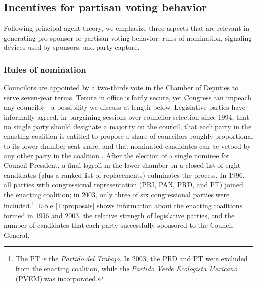 \documentclass[12 pt, letter]{article}
\begin{document}
\subsection{Incentives for partisan voting behavior}
Following principal-agent theory, we emphasize three aspects that are relevant in generating pro-sponsor or partisan voting behavior: rules of nomination, signaling devices used by sponsors, and party capture.

\subsubsection{Rules of nomination}
Councilors are appointed by a two-thirds vote in the Chamber of Deputies to serve seven-year terms.  Tenure in office is fairly secure, yet Congress can impeach any councilor---a possibility we discuss at length below.  Legislative parties have informally agreed, in bargaining sessions over councilor selection since 1994, that no single party should designate a majority on the council, that each party in the enacting coalition is entitled to propose a share of councilors roughly proportional to its lower chamber seat share, and that nominated candidates can be vetoed by any other party in the coalition \citep{Alcocer1995, Schedler2000a}. After the election of a single nominee for Council President, a final logroll in the lower chamber on a closed list of eight candidates (plus a ranked list of replacements) culminates the process.  In 1996, all parties with congressional representation (PRI, PAN, PRD, and PT) joined the enacting coalition; in 2003, only three of six congressional parties were included.\footnote{The PT is the \emph{Partido del Trabajo}.  In 2003, the PRD and PT were excluded from the enacting coalition, while the \emph{Partido Verde Ecologista Mexicano} (PVEM) was incorporated.}  Table \ref{T:proposals} shows information about the enacting coalitions formed in 1996 and 2003, the relative strength of legislative parties, and the number of candidates that each party successfully sponsored to the Council-General.
\end{document}
